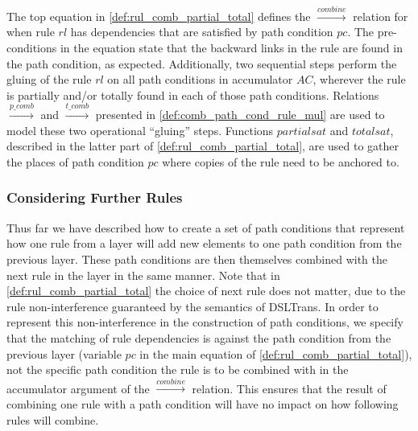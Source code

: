 The top equation in \cref{def:rul_comb_partial_total} defines the $\stackrel{combine}{\rightarrow}$ relation for when rule $rl$ has dependencies that are satisfied by path condition $pc$. The pre-conditions in the equation state that the backward links in the rule are found in the path condition, as expected. Additionally, two sequential steps perform the gluing of the rule $rl$ on all path conditions in accumulator $AC$, wherever the rule is partially and/or totally found in each of those path conditions. Relations $\stackrel{p\_comb}{\rightarrow}$ and $\stackrel{t\_comb}{\rightarrow}$ presented in \cref{def:comb_path_cond_rule_mul} are used to model these two operational ``gluing'' steps. Functions $partialsat$ and $totalsat$, described in the latter part of \cref{def:rul_comb_partial_total}, are used to gather the places of path condition $pc$ where copies of the rule need to be anchored to.


\subsubsection{Considering Further Rules}
\label{sec:further_rules}
Thus far we have described how to create a set of path conditions that represent how one rule from a layer will add new elements to one path condition from the previous layer. These path conditions are then themselves combined with the next rule in the layer in the same manner. Note that in \cref{def:rul_comb_partial_total} the choice of next rule does not matter, due to the rule non-interference guaranteed by the semantics of DSLTrans. In order to represent this non-interference in the construction of path conditions, we specify that the matching of rule dependencies is against the path condition from the previous layer (variable $pc$ in the main equation of \cref{def:rul_comb_partial_total}), not the specific path condition the rule is to be combined with in the accumulator argument of the $\stackrel{combine}{\rightarrow}$ relation. This ensures that the result of combining one rule with a path condition will have no impact on how following rules will combine.


